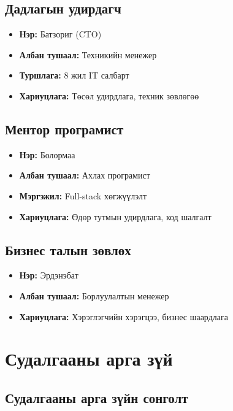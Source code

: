 \documentclass[main.tex]{subfiles}
\begin{document}
\subsection{Дадлагын удирдагч}
\begin{itemize}
    \item \textbf{Нэр:} Батзориг (CTO)
    \item \textbf{Албан тушаал:} Техникийн менежер
    \item \textbf{Туршлага:} 8 жил IT салбарт
    \item \textbf{Хариуцлага:} Төсөл удирдлага, техник зөвлөгөө
\end{itemize}

\subsection{Ментор програмист}
\begin{itemize}
    \item \textbf{Нэр:} Болормаа
    \item \textbf{Албан тушаал:} Ахлах програмист
    \item \textbf{Мэргэжил:} Full-stack хөгжүүлэлт
    \item \textbf{Хариуцлага:} Өдөр тутмын удирдлага, код шалгалт
\end{itemize}

\subsection{Бизнес талын зөвлөх}
\begin{itemize}
    \item \textbf{Нэр:} Эрдэнэбат
    \item \textbf{Албан тушаал:} Борлуулалтын менежер
    \item \textbf{Хариуцлага:} Хэрэглэгчийн хэрэгцээ, бизнес шаардлага
\end{itemize}

\section{Судалгааны арга зүй}

\subsection{Судалгааны арга зүйн сонголт}
\end{document}
